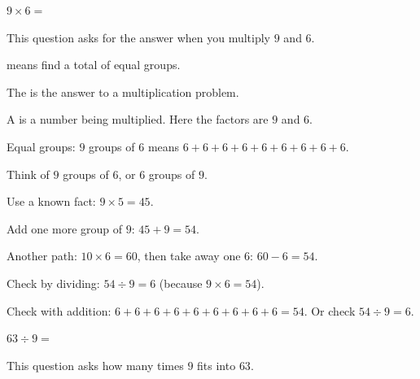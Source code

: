 


\noindent $9 \times 6 = $\ansblank


\noindent This question asks for the answer when you multiply $9$ and $6$.

\begin{words}
  \item {}means find a total of equal groups.
  \item The is the answer to a multiplication problem.
  \item A is a number being multiplied. Here the factors are $9$ and $6$.
  \item Equal groups: $9$ groups of $6$ means $6 + 6 + 6 + 6 + 6 + 6 + 6 + 6 + 6$.
\end{words}

\begin{steps}
  \item Think of $9$ groups of $6$, or $6$ groups of $9$.
  \item Use a known fact: $9 \times 5 = 45$.
  \item Add one more group of $9$: $45 + 9 = 54$.
  \item Another path: $10 \times 6 = 60$, then take away one $6$: $60 - 6 = 54$.
  \item Check by dividing: $54 \div 9 = 6$ (because $9 \times 6 = 54$).
\end{steps}


\noindent Check with addition: $6 + 6 + 6 + 6 + 6 + 6 + 6 + 6 + 6 = 54$. Or
check $54 \div 9 = 6$.


\noindent $63 \div 9 = $\ansblank


\noindent This question asks how many times $9$ fits into $63$.

